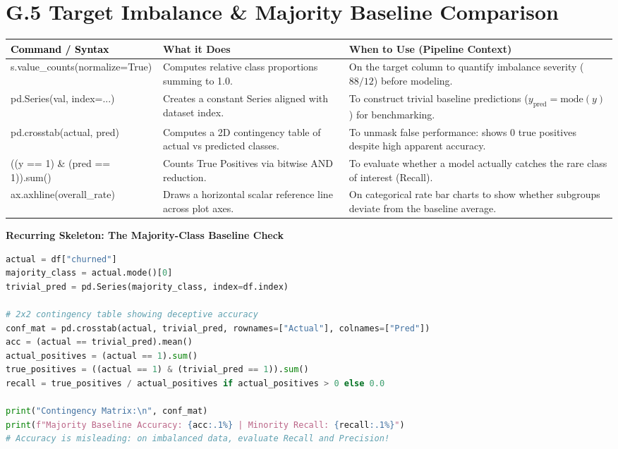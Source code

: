 \documentclass[11pt,a4paper]{article}
\begin{document}
{}
\section*{G.5 Target Imbalance \& Majority Baseline Comparison}

{\small
\noindent
\begin{tabularx}{\textwidth}{|>{\raggedright\arraybackslash\ttfamily\footnotesize\color{codebase}}p{5.8cm}|>{\raggedright\arraybackslash}X|>{\raggedright\arraybackslash}X|}
\hline
\textbf{\textcolor{black}{\textrm{Command / Syntax}}} & \textbf{What it Does} & \textbf{When to Use (Pipeline Context)} \\ \hline
s.value\_counts(normalize=True) & Computes relative class proportions summing to 1.0. & On the target column to quantify imbalance severity ($88/12$) before modeling. \\ \hline
pd.Series(val, index=...) & Creates a constant Series aligned with dataset index. & To construct trivial baseline predictions ($y_{\text{pred}} = \text{mode}(y)$) for benchmarking. \\ \hline
pd.crosstab(actual, pred) & Computes a 2D contingency table of actual vs predicted classes. & To unmask false performance: shows 0 true positives despite high apparent accuracy. \\ \hline
((y == 1) \& (pred == 1)).sum() & Counts True Positives via bitwise AND reduction. & To evaluate whether a model actually catches the rare class of interest (Recall). \\ \hline
ax.axhline(overall\_rate) & Draws a horizontal scalar reference line across plot axes. & On categorical rate bar charts to show whether subgroups deviate from the baseline average. \\ \hline
\end{tabularx}
}

\vspace{0.5em}
\noindent\textbf{Recurring Skeleton: The Majority-Class Baseline Check}\par\vspace{0.2em}\nopagebreak
\begin{lstlisting}[language=Python]
actual = df["churned"]
majority_class = actual.mode()[0]
trivial_pred = pd.Series(majority_class, index=df.index)

# 2x2 contingency table showing deceptive accuracy
conf_mat = pd.crosstab(actual, trivial_pred, rownames=["Actual"], colnames=["Pred"])
acc = (actual == trivial_pred).mean()
actual_positives = (actual == 1).sum()
true_positives = ((actual == 1) & (trivial_pred == 1)).sum()
recall = true_positives / actual_positives if actual_positives > 0 else 0.0

print("Contingency Matrix:\n", conf_mat)
print(f"Majority Baseline Accuracy: {acc:.1%} | Minority Recall: {recall:.1%}")
# Accuracy is misleading: on imbalanced data, evaluate Recall and Precision!
\end{lstlisting}
\end{document}
